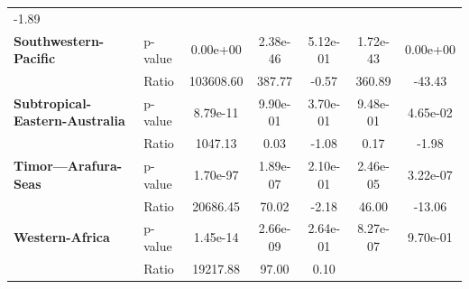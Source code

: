 \begin{table}[H]
{\begin{tabular}{llccccc}
            -1.89
            \\
            \textbf{Southwestern-Pacific}                       & p-value  &
            0.00e+00                                            & 2.38e-46 &
            5.12e-01                                            & 1.72e-43 &
            0.00e+00
            \\
            \textbf{}                                           & Ratio    &
            103608.60                                           & 387.77   &
            -0.57
                                                                & 360.89   &
            -43.43
            \\
            \textbf{Subtropical-Eastern-Australia}              &
            p-value                                             &
            8.79e-11                                            &
            9.90e-01                                            &
            3.70e-01                                            &
            9.48e-01                                            &
            4.65e-02
            \\
            \textbf{}                                           & Ratio    &
            1047.13                                             & 0.03     &
            -1.08
                                                                & 0.17     &
            -1.98
            \\
            \textbf{Timor---Arafura-Seas}                       & p-value  &
            1.70e-97                                            & 1.89e-07 &
            2.10e-01                                            & 2.46e-05 &
            3.22e-07
            \\
            \textbf{}                                           & Ratio    &
            20686.45                                            & 70.02    &
            -2.18
                                                                & 46.00    &
            -13.06
            \\
            \textbf{Western-Africa}                             & p-value  &
            1.45e-14                                            & 2.66e-09 &
            2.64e-01                                            & 8.27e-07 &
            9.70e-01
            \\
            \textbf{}                                           & Ratio    &
            19217.88                                            & 97.00    &
            0.10

\end{tabular}}
\end{table}
